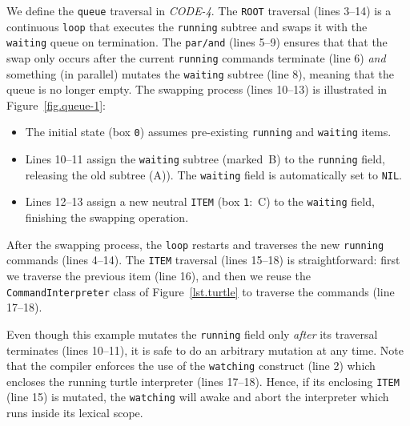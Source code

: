 \documentclass{sig-alternate}
\newcommand{\code}[1] {{\small{\texttt{#1}}}}
\newcommand{\MM}[1] {\textcircled{\tiny{\textsf{#1}}}}
\begin{document}
We define the \code{queue} traversal in \emph{CODE-4}.
%
The \code{ROOT} traversal (lines 3--14) is a continuous \code{loop} that 
executes the \code{running} subtree and swaps it with the \code{waiting} queue 
on termination.
The \code{par/and} (lines 5--9) ensures that that the swap only occurs after 
the current \code{running} commands terminate (line 6) \emph{and} something (in 
parallel) mutates the \code{waiting} subtree (line 8), meaning that the queue 
is no longer empty.
The swapping process (lines 10--13) is illustrated in Figure~\ref{fig.queue-1}: 
%
\begin{itemize}
%
\item The initial state (box \code{0}) assumes pre-existing \code{running} and 
\code{waiting} items.
%
\item Lines 10--11 assign the \code{waiting} subtree (marked~\MM{B}) to the 
\code{running} field, releasing the old subtree (\MM{A})).
The \code{waiting} field is automatically set to \code{NIL}.
%
\item Lines 12--13 assign a new neutral \code{ITEM} (box \code{1}:~\MM{C}) to 
the \code{waiting} field, finishing the swapping operation.
%
\end{itemize}
%
After the swapping process, the \code{loop} restarts and traverses the new 
\code{running} commands (lines 4--14).
%
The \code{ITEM} traversal (lines 15--18) is straightforward:
first we traverse the previous item (line 16), and then we reuse the 
\code{CommandInterpreter} class of Figure~\ref{lst.turtle} to traverse the 
commands (line 17--18).

Even though this example mutates the \code{running} field only \emph{after} its 
traversal terminates (lines 10--11), it is safe to do an arbitrary mutation at 
any time.
Note that the compiler enforces the use of the \code{watching} construct (line 
2) which encloses the running turtle interpreter (lines 17--18).
Hence, if its enclosing \code{ITEM} (line 15) is mutated, the \code{watching} 
will awake and abort the interpreter which runs inside its lexical scope.
\end{document}
